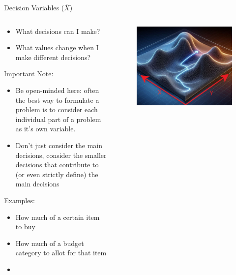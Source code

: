 \documentclass[10pt, aspectratio=169]{beamer}
\begin{document}
\begin{frame}{Decision Variables ($\overline{X}$)}
    \begin{columns}
        \begin{column}{0.5\textwidth}
            \begin{itemize}
                \item What decisions can I make?
                \item What values change when I make different decisions?
            \end{itemize}
            Important Note:
            \begin{itemize}
                \item Be open-minded here: often the best way to formulate a problem is to consider each individual part of a problem as it's own variable.
                \item Don't just consider the main decisions, consider the smaller decisions that contribute to (or even strictly define) the main decisions
            \end{itemize}
            Examples:
            \begin{itemize}
                \item How much of a certain item to buy
                \item How much of a budget category to allot for that item
                \item 
            \end{itemize}
        \end{column}
        \begin{column}{0.5\textwidth}
            \begin{figure}
                \includegraphics[width=0.8\linewidth]{MountainWithDecisionVariables.jpeg}
            \end{figure}
        \end{column}
    \end{columns}
\end{frame}
\end{document}
